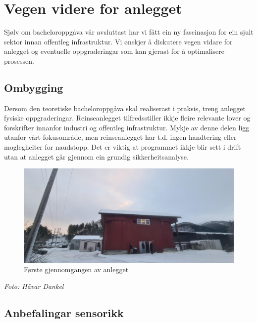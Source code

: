 \section{Vegen videre for anlegget}
\thispagestyle{fancy}

Sjølv om bacheloroppgåva vår avsluttast har vi fått ein ny fascinasjon for ein sjult sektor innan offentleg infrastruktur. 
Vi ønskjer å diskutere vegen vidare for anlegget og eventuelle oppgraderingar som kan gjerast for å optimalisere prosessen.


\subsection{Ombygging}

Dersom den teoretiske bacheloroppgåva skal realiserast i praksis, treng anlegget fysiske oppgraderingar.
Reinseanlegget tilfredsstiller ikkje fleire relevante lover og forskrifter innanfor industri og offentleg infrastruktur.
Mykje av denne delen ligg utanfor vårt fokusområde, men reinseanlegget har t.d. ingen handtering eller moglegheiter for naudstopp.
Det er viktig at programmet ikkje blir sett i drift utan at anlegget går gjennom ein grundig sikkerheitsanalyse.

\begin{figure}[htbp]
    \centering
    \includegraphics[width=1\textwidth]{Bilder/SandeGjennomgang.jpg}
    \caption{Første gjennomgangen av anlegget}\label{fig:Bilete Gjennomgang}
\end{figure}

\begin{center}
    \textit{Foto: Håvar Dankel}
\end{center}

\newpage

\subsection{Anbefalingar sensorikk}

